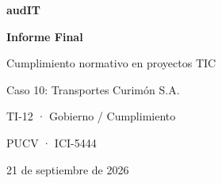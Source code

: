 \begin{titlepage}
\thispagestyle{empty}
\centering
\vspace*{2cm}
{\color{audITteal}\fontsize{24}{28}\selectfont\bfseries audIT\par}
\vspace{1.2cm}
{\color{audITnavy}\fontsize{26}{31}\selectfont\bfseries Informe Final\par}
\vspace{0.5cm}
{\color{audITnavy}\Large Cumplimiento normativo en proyectos TIC\par}
\vspace{1.5cm}
{\Large Caso 10: Transportes Curimón S.A.\par}
\vspace{0.4cm}
{\large TI-12 · Gobierno / Cumplimiento\par}
\vfill
{\large PUCV · ICI-5444\par}
{\large 21 de septiembre de 2026\par}
\end{titlepage}
